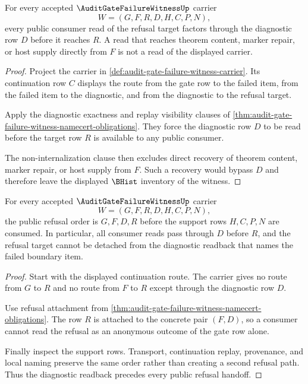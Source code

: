 \begin{theorem}
\label{thm:audit-gate-failure-witness-target-readback-totality}
For every accepted $\AuditGateFailureWitnessUp$ carrier
$$
W=(G,F,R,D,H,C,P,N),
$$
every public consumer read of the refusal target factors through the diagnostic row $D$ before it reaches $R$. A read that reaches theorem content, marker repair, or host supply directly from $F$ is not a read of the displayed carrier.
\end{theorem}
\begin{proof}
Project the carrier in \autoref{def:audit-gate-failure-witness-carrier}. Its continuation row $C$ displays the route from the gate row to the failed item, from the failed item to the diagnostic, and from the diagnostic to the refusal target.

Apply the diagnostic exactness and replay visibility clauses of \autoref{thm:audit-gate-failure-witness-namecert-obligations}. They force the diagnostic row $D$ to be read before the target row $R$ is available to any public consumer.

The non-internalization clause then excludes direct recovery of theorem content, marker repair, or host supply from $F$. Such a recovery would bypass $D$ and therefore leave the displayed $\BHist$ inventory of the witness.
\end{proof}

\begin{theorem}
\label{thm:audit-gate-failure-witness-diagnostic-refusal-order}
For every accepted $\AuditGateFailureWitnessUp$ carrier
$$
W=(G,F,R,D,H,C,P,N),
$$
the public refusal order is $G,F,D,R$ before the support rows $H,C,P,N$ are consumed. In particular, all consumer reads pass through $D$ before $R$, and the refusal target cannot be detached from the diagnostic readback that names the failed boundary item.
\end{theorem}
\begin{proof}
Start with the displayed continuation route. The carrier gives no route from $G$ to $R$ and no route from $F$ to $R$ except through the diagnostic row $D$.

Use refusal attachment from \autoref{thm:audit-gate-failure-witness-namecert-obligations}. The row $R$ is attached to the concrete pair $(F,D)$, so a consumer cannot read the refusal as an anonymous outcome of the gate row alone.

Finally inspect the support rows. Transport, continuation replay, provenance, and local naming preserve the same order rather than creating a second refusal path. Thus the diagnostic readback precedes every public refusal handoff.
\end{proof}

